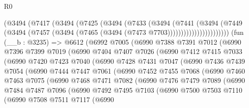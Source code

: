 \begin{lexlean}{R0}
\begin{coremodule}
                  (@3494
                    (@7417
                      (@3494
                        (@7425
                          (@3494
                            (@7433
                              (@3494
                                (@7441
                                  (@3494
                                    (@7449
                                      (@3494
                                        (@7457
                                          (@3494 (@7465 (@3494 (@7473 @7703)))))))))))))))))))))))
    (fun (__b : @3235) =>
    @6612
      (@6992
        @7005
        (@6990
          @7388
          @7391
          @7012
          (@6990
            @7396
            @7399
            @7019
            (@6990
              @7404
              @7407
              @7026
              (@6990
                @7412
                @7415
                @7033
                (@6990
                  @7420
                  @7423
                  @7040
                  (@6990
                    @7428
                    @7431
                    @7047
                    (@6990
                      @7436
                      @7439
                      @7054
                      (@6990
                        @7444
                        @7447
                        @7061
                        (@6990
                          @7452
                          @7455
                          @7068
                          (@6990
                            @7460
                            @7463
                            @7075
                            (@6990
                              @7468
                              @7471
                              @7082
                              (@6990
                                @7476
                                @7479
                                @7089
                                (@6990
                                  @7484
                                  @7487
                                  @7096
                                  (@6990
                                    @7492
                                    @7495
                                    @7103
                                    (@6990
                                      @7500
                                      @7503
                                      @7110
                                      (@6990
                                        @7508
                                        @7511
                                        @7117
                                        (@6990

\end{coremodule}
\end{lexlean}
